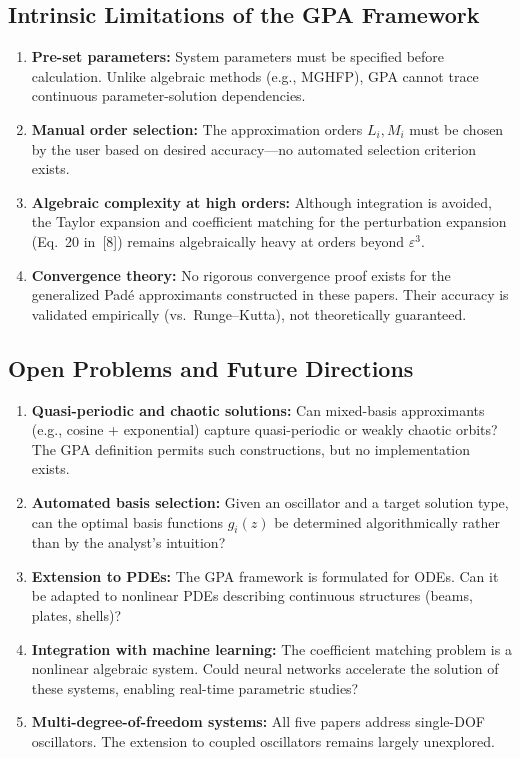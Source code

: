 \documentclass[11pt,a4paper]{article}
\begin{document}
\subsection{Intrinsic Limitations of the GPA Framework}

\begin{enumerate}[leftmargin=2em]
\item \textbf{Pre-set parameters:} System parameters must be specified before calculation. Unlike algebraic methods (e.g., MGHFP), GPA cannot trace continuous parameter-solution dependencies.
\item \textbf{Manual order selection:} The approximation orders $L_i, M_i$ must be chosen by the user based on desired accuracy---no automated selection criterion exists.
\item \textbf{Algebraic complexity at high orders:} Although integration is avoided, the Taylor expansion and coefficient matching for the perturbation expansion (Eq.\ 20 in~[8]) remains algebraically heavy at orders beyond $\varepsilon^3$.
\item \textbf{Convergence theory:} No rigorous convergence proof exists for the generalized Pad\'e approximants constructed in these papers. Their accuracy is validated empirically (vs.\ Runge--Kutta), not theoretically guaranteed.
\end{enumerate}

\subsection{Open Problems and Future Directions}

\begin{enumerate}[leftmargin=2em]
\item \textbf{Quasi-periodic and chaotic solutions:} Can mixed-basis approximants (e.g., cosine + exponential) capture quasi-periodic or weakly chaotic orbits? The GPA definition permits such constructions, but no implementation exists.
\item \textbf{Automated basis selection:} Given an oscillator and a target solution type, can the optimal basis functions $g_i(z)$ be determined algorithmically rather than by the analyst's intuition?
\item \textbf{Extension to PDEs:} The GPA framework is formulated for ODEs. Can it be adapted to nonlinear PDEs describing continuous structures (beams, plates, shells)?
\item \textbf{Integration with machine learning:} The coefficient matching problem is a nonlinear algebraic system. Could neural networks accelerate the solution of these systems, enabling real-time parametric studies?
\item \textbf{Multi-degree-of-freedom systems:} All five papers address single-DOF oscillators. The extension to coupled oscillators remains largely unexplored.
\end{enumerate}
\end{document}
